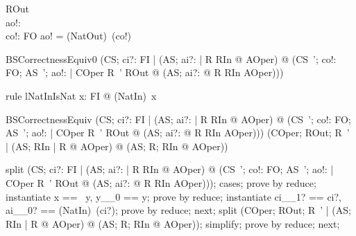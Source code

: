 \begin{schema}{ROut}
  \zretrieveout \\
   ao!: \nat \\
   co!: FO
\where
   ao! = (NatOut\inv)~(co!)
\end{schema}

\begin{theorem}{BSCorrectnessEquiv0} 
  (\forall CS; ci?: FI  | (\forall AS; ai?: \nat | R \land RIn @ \pre AOper) @
  	(\forall CS~'; co!: FO; AS~'; ao!: \nat | COper \land R~' \land ROut @
  		(\exists AS; ai?: \nat @ R \land RIn \land AOper)))
\end{theorem}


\begin{theorem}{rule lNatInIsNat}
   \forall x: FI @ (NatIn\inv)~x 
\end{theorem}

\begin{theorem}{BSCorrectnessEquiv} 
  (\forall CS; ci?: FI  | (\forall AS; ai?: \nat | R \land RIn @ \pre AOper) @
  	(\forall CS~'; co!: FO; AS~'; ao!: \nat | COper \land R~' \land ROut @
  		(\exists AS; ai?: \nat @ R \land RIn \land AOper)))
  	\iff
  (\forall COper; ROut; R~' | (\forall AS; RIn | R @ \pre AOper) @ (\exists AS; R; RIn @ AOper))
\end{theorem}

\begin{zproof}[BSCorrectnessEquiv]
split (\forall CS; ci?: FI  | (\forall AS; ai?: \nat | R \land RIn @ \pre AOper) @
  	(\forall CS~'; co!: FO; AS~'; ao!: \nat | COper \land R~' \land ROut @
  		(\exists AS; ai?: \nat @ R \land RIn \land AOper)));
cases;
prove by reduce;
instantiate x == \ran~y, y\_\_0 == y;
prove by reduce;
instantiate ci\_\_1? == ci?, ai\_\_0? == (NatIn\inv)~(ci?);
prove by reduce;
next;
split (\forall COper; ROut; R~' | (\forall AS; RIn | R @ \pre AOper) @ (\exists AS; R; RIn @ AOper));
simplify;
prove by reduce;
next;
\end{zproof}
